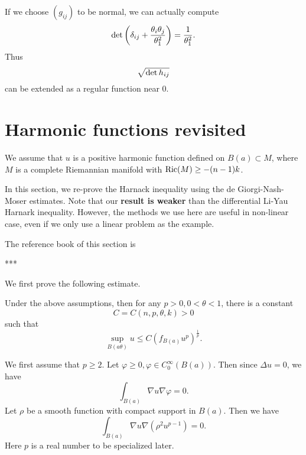 If we choose $ (g_{ij}) $ to be normal, we can actually compute 
%
\[ {\rm det}\left( \delta_{ij} + \frac{\theta_i \theta_j}{\theta^2_1} \right) = \frac{1}{\theta^2_1}.\]
%
Thus 
%
\[ \sqrt{{\rm det}\,h_{ij}} \]
can be extended as a regular function near 0.


\section{Harmonic functions revisited}
We assume that $ u$ is a positive harmonic function defined on $ B(a) \subset M $, where $ M$ is a complete Riemannian manifold with ${\rm Ric} (M) \geq - (n-1) k $.

In this section, we re-prove the Harnack inequality using the de Giorgi-Nash-Moser estimates. Note that our {\bf result is weaker} than the differential Li-Yau Harnark inequality. However, the methods we use here are useful in non-linear case, even if we only  use a linear problem as the example.

The reference book of this section is 

***

We first prove the following estimate.

\begin{theorem} Under the above assumptions, then for any $ p > 0 , 0 < \theta < 1 $, there is a constant 
%
\[ C= C (n, p, \theta, k ) > 0 \]
%
 such that 
%
\[ \sup_{B(a\theta)} u \leq C (f _{B(a)} u^p ) ^{\frac{1}{p}}.\]
\end{theorem}

 We first assume that $ p \geq 2$.
Let $ \varphi \geq 0 , \varphi \in C^\infty_0 (B(a))$. Then since  $ \Delta u = 0 $, we have 
%
\[ \int _{B(a)} \nabla u \nabla \varphi = 0. \]
%
Let $\rho$ be a smooth function with compact support in $ B(a)$. Then we have 
%
\[ \int _{B(a)} \nabla u \nabla (\rho^2 u ^{p-1} )  = 0.\]
%
Here $p$ is a real number to be specialized later.

